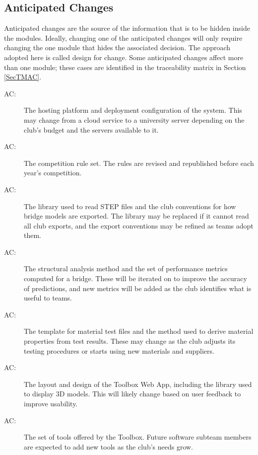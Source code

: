 \documentclass[12pt, titlepage]{article}
\newcounter{acnum}
\newcommand{\actheacnum}{AC\theacnum}
\begin{document}
\subsection{Anticipated Changes} \label{SecAchange}
Anticipated changes are the source of the information that is to be hidden inside the modules. Ideally, changing one of the anticipated changes will only require changing the one module that hides the associated decision. The approach adopted here is called design for change. Some anticipated changes affect more than one module; these cases are identified in the traceability matrix in Section \ref{SecTMAC}.

\begin{description}
\item[ \actheacnum \label{acHardware}:]
  The hosting platform and deployment configuration of the system. This may change from a cloud service to a university server depending on the club's budget and the servers available to it.
\item[ \actheacnum \label{acRules}:]
  The competition rule set. The rules are revised and republished before each year's competition.
\item[ \actheacnum \label{acModelInput}:]
  The library used to read STEP files and the club conventions for how bridge models are exported. The library may be replaced if it cannot read all club exports, and the export conventions may be refined as teams adopt them.
\item[ \actheacnum \label{acAnalysis}:]
  The structural analysis method and the set of performance metrics computed for a bridge. These will be iterated on to improve the accuracy of predictions, and new metrics will be added as the club identifies what is useful to teams.
\item[ \actheacnum \label{acMaterial}:]
  The template for material test files and the method used to derive material properties from test results. These may change as the club adjusts its testing procedures or starts using new materials and suppliers.
\item[ \actheacnum \label{acUI}:]
  The layout and design of the Toolbox Web App, including the library used to display 3D models. This will likely change based on user feedback to improve usability.
\item[ \actheacnum \label{acServices}:]
  The set of tools offered by the Toolbox. Future software subteam members are expected to add new tools as the club's needs grow.

\end{description}
\end{document}
